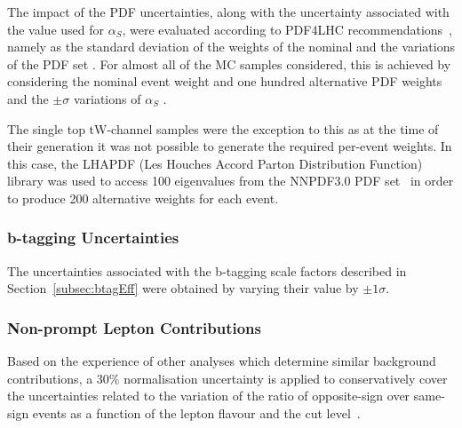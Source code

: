 The impact of the PDF uncertainties, along with the uncertainty associated with the value used for $\alpha_{S}$, were evaluated according to PDF4LHC recommendations~\cite{Butterworth:2015oua}, namely as the standard deviation of the weights of the nominal and the variations of the PDF set .
For almost all of the MC samples considered, this is achieved by considering the nominal event weight and one hundred alternative PDF weights and the $\pm \sigma$ variations of $\alpha_{S}$ .

The single top tW-channel samples were the exception to this as at the time of their generation it was not possible to generate the required per-event weights.
In this case, the LHAPDF (Les Houches Accord Parton Distribution Function) library was used to access 100 eigenvalues from the NNPDF3.0 PDF set~\cite{Ball:2014uwa} in order to produce 200 alternative weights for each event.

\subsubsection*{b-tagging Uncertainties}
The uncertainties associated with the b-tagging scale factors described in Section~\ref{subsec:btagEff} were obtained by varying their value by $\pm 1\sigma$.

\subsubsection*{Non-prompt Lepton Contributions}
Based on the experience of other analyses which determine similar background contributions, a 30\% normalisation uncertainty is applied to conservatively cover the uncertainties related to the variation of the ratio of opposite-sign over same-sign events as a function of the lepton flavour and the cut level~\cite{CMS:2016syx,CMS:2015vqc}.


